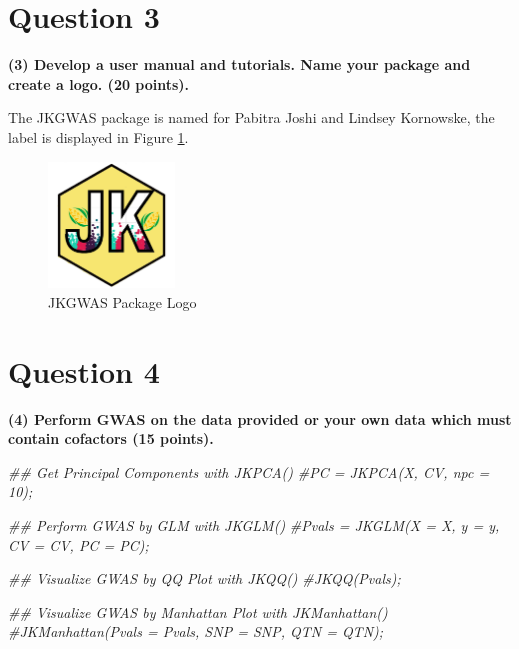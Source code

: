 \documentclass[
]{article}
\newenvironment{Shaded}{\begin{snugshade}}{\end{snugshade}}
\newcommand{\CommentTok}[1]{\textcolor[rgb]{0.56,0.35,0.01}{\textit{#1}}}
\begin{document}
\par

\hypertarget{question-3}{%
\section{Question 3}\label{question-3}}

\textbf{(3) Develop a user manual and tutorials. Name your package and create a logo. (20 points).}

The JKGWAS package is named for Pabitra Joshi and Lindsey Kornowske, the
label is displayed in Figure \ref{fig:logo}.

\begin{figure}[htbp]
\begin{center}
\includegraphics[width = 0.3\textwidth]{JKGWAS_logo.png}
  \caption{JKGWAS Package Logo}
  \label{fig:logo}
\end{center}
\end{figure}

\hypertarget{question-4}{%
\section{Question 4}\label{question-4}}

\textbf{(4) Perform GWAS on the data provided or your own data which must contain cofactors (15 points).}

\begin{Shaded}
\begin{Highlighting}[]
\CommentTok{\#\# Get Principal Components with JKPCA()}
\CommentTok{\#PC = JKPCA(X, CV, npc = 10);}

\CommentTok{\#\# Perform GWAS by GLM with JKGLM()}
\CommentTok{\#Pvals = JKGLM(X = X, y = y, CV = CV, PC = PC);}

\CommentTok{\#\# Visualize GWAS by QQ Plot with JKQQ()}
\CommentTok{\#JKQQ(Pvals);}

\CommentTok{\#\# Visualize GWAS by Manhattan Plot with JKManhattan()}
\CommentTok{\#JKManhattan(Pvals = Pvals, SNP = SNP, QTN = QTN);}
\end{Highlighting}
\end{Shaded}
\end{document}
